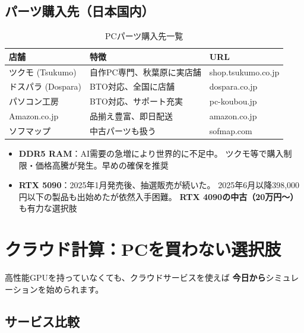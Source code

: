 \documentclass[12pt,a4paper]{ltjsarticle}
\begin{document}
\subsection{パーツ購入先（日本国内）}

\begin{table}[h]
\centering\sffamily\small
\caption{PCパーツ購入先一覧}
\begin{tabular}{@{}lll@{}}
\toprule
\textbf{店舗} & \textbf{特徴} & \textbf{URL} \\
\midrule
ツクモ (Tsukumo) & 自作PC専門、秋葉原に実店舗 & shop.tsukumo.co.jp \\
ドスパラ (Dospara) & BTO対応、全国に店舗 & dospara.co.jp \\
パソコン工房 & BTO対応、サポート充実 & pc-koubou.jp \\
Amazon.co.jp & 品揃え豊富、即日配送 & amazon.co.jp \\
ソフマップ & 中古パーツも扱う & sofmap.com \\
\bottomrule
\end{tabular}
\end{table}

\begin{warningbox}[2026年3月現在の注意]
\begin{itemize}[leftmargin=2em]
  \item \textbf{DDR5 RAM}：AI需要の急増により世界的に不足中。
        ツクモ等で購入制限・価格高騰が発生。早めの確保を推奨
  \item \textbf{RTX 5090}：2025年1月発売後、抽選販売が続いた。
        2025年6月以降398,000円以下の製品も出始めたが依然入手困難。
        \textbf{RTX 4090の中古（20万円〜）}も有力な選択肢
\end{itemize}
\end{warningbox}

\newpage
\section{クラウド計算：PCを買わない選択肢}

\begin{infobox}[PCを自作せずにプラズマシミュレーションを始める方法]
高性能GPUを持っていなくても、クラウドサービスを使えば
\textbf{今日から}シミュレーションを始められます。
\end{infobox}

\subsection{サービス比較}
\end{document}
